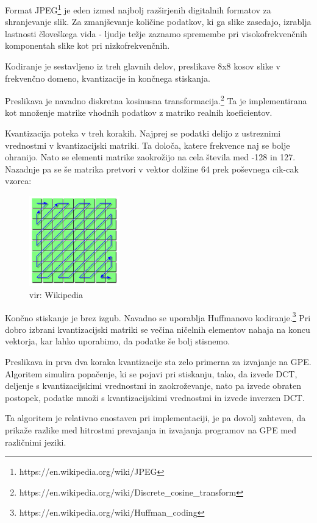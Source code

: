 \documentclass[journal,a4paper,twoside]{sty/IEEEtran}
\begin{document}
Format JPEG\footnote{https://en.wikipedia.org/wiki/JPEG} je eden izmed najbolj razširjenih digitalnih formatov za shranjevanje slik.
Za zmanjševanje količine podatkov, ki ga slike zasedajo, izrablja lastnosti človeškega vida - ljudje težje zaznamo spremembe pri visokofrekvenčnih
	komponentah slike kot pri nizkofrekvenčnih.

Kodiranje je sestavljeno iz treh glavnih delov, preslikave 8x8 kosov slike v frekvenčno domeno, kvantizacije in končnega stiskanja.

Preslikava je navadno diskretna kosinusna transformacija.\footnote{https://en.wikipedia.org/wiki/Discrete\_cosine\_transform}
Ta je implementirana kot množenje matrike vhodnih podatkov z matriko realnih koeficientov.

Kvantizacija poteka v treh korakih.
Najprej se podatki delijo z ustreznimi vrednostmi v kvantizacijski matriki.
Ta določa, katere frekvence naj se bolje ohranijo.
Nato se elementi matrike zaokrožijo na cela števila med -128 in 127.
Nazadnje pa se še matrika pretvori v vektor dolžine 64 prek poševnega cik-cak vzorca:

\begin{figure}[h]
\centering
\includegraphics[width=0.35\textwidth]{jpeg_zigzag}
\caption{vir: Wikipedia}
\end{figure}

Končno stiskanje je brez izgub.
Navadno se uporablja Huffmanovo kodiranje.\footnote{https://en.wikipedia.org/wiki/Huffman\_coding}
Pri dobro izbrani kvantizacijski matriki se večina ničelnih elementov nahaja na koncu vektorja, kar lahko uporabimo, da podatke še bolj stisnemo.

Preslikava in prva dva koraka kvantizacije sta zelo primerna za izvajanje na GPE.
Algoritem simulira popačenje, ki se pojavi pri stiskanju, tako, da izvede DCT, deljenje s kvantizacijskimi vrednostmi in zaokroževanje, nato pa izvede
	obraten postopek, podatke množi s kvantizacijskimi vrednostmi in izvede inverzen DCT.

Ta algoritem je relativno enostaven pri implementaciji, je pa dovolj zahteven, da prikaže razlike med hitrostmi prevajanja in izvajanja programov na GPE
	med različnimi jeziki.
\end{document}
